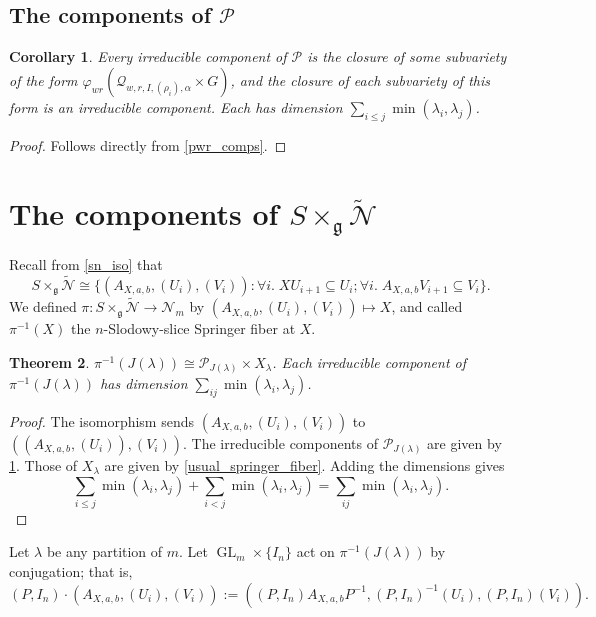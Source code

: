 \documentclass[12pt,psamsfonts]{article}
\DeclareMathOperator{\GL}{GL}
\newtheorem{theorem}{Theorem}[section]
\newtheorem{corollary}[theorem]{Corollary}
\begin{document}
\subsection{The components of \texorpdfstring{\(\mathcal{P}\)}{P}}
\begin{corollary}\label{p_comps}
    Every irreducible component of \(\mathcal{P}\) is the closure of some subvariety of the form \(\varphi_{wr}(\mathcal{Q}_{w,r,I,(\rho_i),\alpha} \times G)\), and the closure of each subvariety of this form is an irreducible component.
    Each has dimension \(\sum_{i \leq j} \min(\lambda_i, \lambda_j)\).
\end{corollary}
\begin{proof}
    Follows directly from \cref{pwr_comps}.
\end{proof}

\section{The components of \texorpdfstring{\(S \times_\mathfrak{g} \widetilde{\mathcal{N}}\)}{S x\_g N}}
Recall from \cref{sn_iso} that 
\[S \times_\mathfrak{g} \widetilde{\mathcal{N}} \cong \{(A_{X,a,b}, (U_i), (V_i)) : \forall i. \; XU_{i + 1} \subseteq U_i; \forall i. \; A_{X,a,b} V_{i + 1} \subseteq V_i\}.\]
We defined \(\pi : S \times_\mathfrak{g} \widetilde{\mathcal{N}} \to \mathcal{N}_m\) by \((A_{X,a,b}, (U_i), (V_i)) \mapsto X\), and called \(\pi^{-1}(X)\) the \(n\)-Slodowy-slice Springer fiber at \(X\).
\begin{theorem}\label{springer_fiber_comps}
    \(\pi^{-1}(J(\lambda)) \cong \mathcal{P}_{J(\lambda)} \times X_\lambda\).
    Each irreducible component of \(\pi^{-1}(J(\lambda))\) has dimension \(\sum_{ij} \min(\lambda_i, \lambda_j)\).
\end{theorem}
\begin{proof}
    The isomorphism sends \((A_{X,a,b}, (U_i), (V_i))\) to \(((A_{X, a, b}, (U_i)), (V_i))\).
    The irreducible components of \(\mathcal{P}_{J(\lambda)}\) are given by \cref{p_comps}.
    Those of \(X_\lambda\) are given by \cref{usual_springer_fiber}.
    Adding the dimensions gives 
    \[\sum_{i \leq j} \min(\lambda_i, \lambda_j) + \sum_{i < j} \min(\lambda_i, \lambda_j) = \sum_{ij} \min(\lambda_i, \lambda_j).\]
\end{proof}

Let \(\lambda\) be any partition of \(m\).
Let \(\GL_m \times \{I_n\}\) act on \(\pi^{-1}(J(\lambda))\) by conjugation; that is,
\[(P, I_n) \cdot (A_{X, a, b}, (U_i), (V_i)) := ((P,I_n)A_{X,a,b}P^{-1},(P,I_n)^{-1}(U_i), (P,I_n)(V_i)).\]
\end{document}
